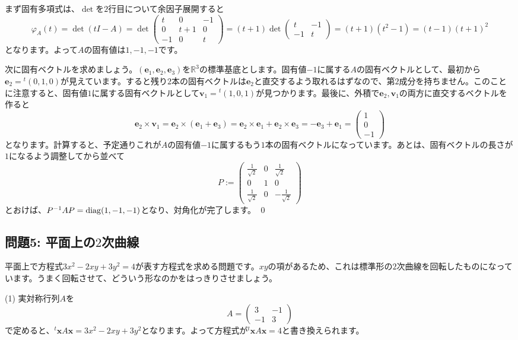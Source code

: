 まず固有多項式は、$\det$を$2$行目について余因子展開すると
\[
\varphi_A(t) = \det(tI - A) = 
\det
\begin{pmatrix}
t & 0 & -1 \\
0 & t + 1 & 0 \\
-1 & 0 & t 
\end{pmatrix}
=
(t + 1)
\det
\begin{pmatrix}
t & -1 \\
-1 & t 
\end{pmatrix}
= (t + 1)(t^2 - 1)
= (t - 1)(t + 1)^2
\]
となります。よって$A$の固有値は$1, -1, -1$です。

次に固有ベクトルを求めましょう。$(\bm{e}_1, \bm{e}_2, \bm{e}_3)$を$\mathbb{R}^3$の標準基底とします。固有値$-1$に属する$A$の固有ベクトルとして、最初から$\bm{e}_2 = {}^t(0, 1, 0)$が見えています。すると残り$2$本の固有ベクトルは$\bm{e}_2$と直交するよう取れるはずなので、第$2$成分を持ちません。このことに注意すると、固有値$1$に属する固有ベクトルとして$\bm{v}_1 = {}^t(1, 0, 1)$が見つかります。最後に、外積で$\bm{e}_2, \bm{v}_1$の両方に直交するベクトルを作ると
\[
\bm{e}_2 \times \bm{v}_1 = \bm{e}_2 \times (\bm{e}_1 + \bm{e}_3) = \bm{e}_2 \times \bm{e}_1 + \bm{e}_2 \times \bm{e}_3
= -\bm{e}_3 + \bm{e}_1 = 
\begin{pmatrix}
1 \\
0 \\
-1
\end{pmatrix}
\]
となります。計算すると、予定通りこれが$A$の固有値$-1$に属するもう$1$本の固有ベクトルになっています。あとは、固有ベクトルの長さが$1$になるよう調整してから並べて
\[
P := 
\begin{pmatrix}
\frac{1}{\sqrt{2}} & 0 & \frac{1}{\sqrt{2}} \\
0 & 1 & 0 \\
\frac{1}{\sqrt{2}} & 0 & -\frac{1}{\sqrt{2}}
\end{pmatrix}
\]
とおけば、$P^{-1} A P = \operatorname{diag}(1, -1, -1)$となり、対角化が完了します。 \qed

\subsection{問題5: 平面上の$2$次曲線}

平面上で方程式$3x^2 - 2xy + 3y^2 = 4$が表す方程式を求める問題です。$xy$の項があるため、これは標準形の$2$次曲線を回転したものになっています。うまく回転させて、どういう形なのかをはっきりさせましょう。

\noindent (1) 実対称行列$A$を
\[
A =
\begin{pmatrix}
3 & -1 \\
-1 & 3
\end{pmatrix}
\]
で定めると、${}^t\bm{x} A \bm{x} = 3x^2 - 2xy + 3y^2$となります。よって方程式が${}^t\bm{x} A \bm{x} = 4$と書き換えられます。

